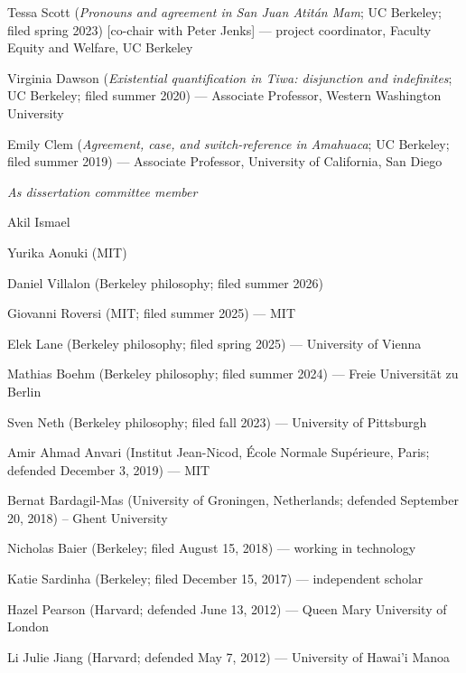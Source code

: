 \documentclass[12pt]{article}
\begin{document}
\ind Tessa Scott (\emph{Pronouns and agreement in San Juan Atitán Mam}; UC Berkeley; filed spring 2023) [co-chair with Peter Jenks] ---  project coordinator, Faculty Equity and Welfare, UC Berkeley

\ind Virginia Dawson (\emph{Existential quantification in Tiwa: disjunction and indefinites}; UC Berkeley; filed summer 2020) ---  Associate Professor, Western Washington University

\ind Emily Clem (\emph{Agreement, case, and switch-reference in Amahuaca}; UC Berkeley; filed summer 2019) ---  Associate Professor, University of California, San Diego



\medskip



\noindent\emph{As dissertation committee member\vspace{0.05in}}



\ind Akil Ismael 


\ind Yurika Aonuki (MIT)

\ind Daniel Villalon (Berkeley philosophy; filed summer 2026) 

\ind Giovanni Roversi (MIT; filed summer 2025) --- MIT

\ind Elek Lane (Berkeley philosophy; filed spring 2025)  --- University of Vienna


\ind Mathias Boehm (Berkeley philosophy; filed summer 2024) --- Freie Universit\"at zu Berlin

\ind Sven Neth  (Berkeley philosophy; filed fall 2023) --- University of Pittsburgh 

\ind Amir Ahmad Anvari (Institut Jean-Nicod, 
\'Ecole Normale Sup\'erieure, Paris; defended December 3, 2019) --- MIT


\ind Bernat Bardagil-Mas (University of Groningen, Netherlands; defended September 20, 2018) --  Ghent University

\ind Nicholas Baier (Berkeley; filed August 15, 2018) --- working in technology


\ind Katie Sardinha (Berkeley; filed December 15, 2017) --- independent scholar %


\ind Hazel Pearson (Harvard; defended June 13, 2012) --- Queen Mary University of London %

\ind Li Julie Jiang (Harvard; defended May 7, 2012) --- University of Hawai'i Manoa %



\medskip
\end{document}
